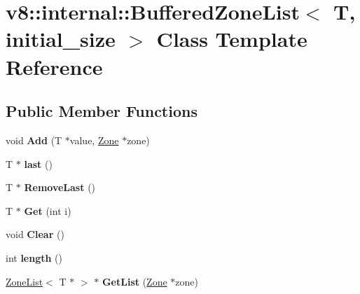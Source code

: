 \hypertarget{classv8_1_1internal_1_1_buffered_zone_list}{}\section{v8\+:\+:internal\+:\+:Buffered\+Zone\+List$<$ T, initial\+\_\+size $>$ Class Template Reference}
\label{classv8_1_1internal_1_1_buffered_zone_list}
\subsection*{Public Member Functions}
\begin{DoxyCompactItemize}
\item 
void {\bfseries Add} (T $\ast$value, \hyperlink{classv8_1_1internal_1_1_zone}{Zone} $\ast$zone)\hypertarget{classv8_1_1internal_1_1_buffered_zone_list_a3de4c84270cb42702572ced51d30d26f}{}\label{classv8_1_1internal_1_1_buffered_zone_list_a3de4c84270cb42702572ced51d30d26f}

\item 
T $\ast$ {\bfseries last} ()\hypertarget{classv8_1_1internal_1_1_buffered_zone_list_acc8665e024d0570dfef2847261822236}{}\label{classv8_1_1internal_1_1_buffered_zone_list_acc8665e024d0570dfef2847261822236}

\item 
T $\ast$ {\bfseries Remove\+Last} ()\hypertarget{classv8_1_1internal_1_1_buffered_zone_list_a1f06b478c7304885877438e715bf9305}{}\label{classv8_1_1internal_1_1_buffered_zone_list_a1f06b478c7304885877438e715bf9305}

\item 
T $\ast$ {\bfseries Get} (int i)\hypertarget{classv8_1_1internal_1_1_buffered_zone_list_a3101d8115fdbd13dee7caa1d9bdcde63}{}\label{classv8_1_1internal_1_1_buffered_zone_list_a3101d8115fdbd13dee7caa1d9bdcde63}

\item 
void {\bfseries Clear} ()\hypertarget{classv8_1_1internal_1_1_buffered_zone_list_aa6708f8a2bfc60b2e4fc53868519ff49}{}\label{classv8_1_1internal_1_1_buffered_zone_list_aa6708f8a2bfc60b2e4fc53868519ff49}

\item 
int {\bfseries length} ()\hypertarget{classv8_1_1internal_1_1_buffered_zone_list_ab563a66475d19eae0dbf063c3e3f928a}{}\label{classv8_1_1internal_1_1_buffered_zone_list_ab563a66475d19eae0dbf063c3e3f928a}

\item 
\hyperlink{classv8_1_1internal_1_1_zone_list}{Zone\+List}$<$ T $\ast$ $>$ $\ast$ {\bfseries Get\+List} (\hyperlink{classv8_1_1internal_1_1_zone}{Zone} $\ast$zone)\hypertarget{classv8_1_1internal_1_1_buffered_zone_list_a0b4985b4ddc528e77143003a03afabae}{}\label{classv8_1_1internal_1_1_buffered_zone_list_a0b4985b4ddc528e77143003a03afabae}

\end{DoxyCompactItemize}
